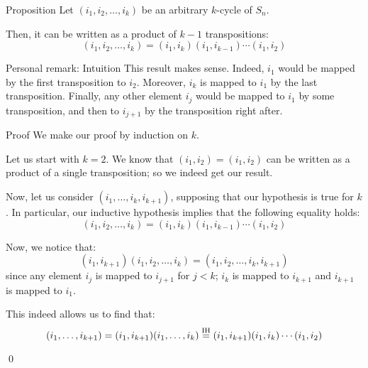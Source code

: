 \documentclass[a4paper]{article}
\begin{document}
\begin{parag}{Proposition}
    Let $\left(i_1, i_2, \ldots, i_k\right)$ be an arbitrary $k$-cycle of $S_n$.

    Then, it can be written as a product of $k-1$ transpositions: 
    \[\left(i_1, i_2, \ldots, i_k\right) = \left(i_1, i_k\right)\left(i_1, i_{k-1}\right)\cdots\left(i_1, i_{2}\right)\]

    \begin{subparag}{Personal remark: Intuition}
        This result makes sense. Indeed, $i_1$ would be mapped by the first transposition to $i_2$. Moreover, $i_k$ is mapped to $i_1$ by the last transposition. Finally, any other element $i_j$ would be mapped to $i_1$ by some transposition, and then to $i_{j+1}$ by the transposition right after.
    \end{subparag}

    \begin{subparag}{Proof}
        We make our proof by induction on $k$.

        Let us start with $k = 2$. We know that $\left(i_1, i_2\right) = \left(i_1, i_2\right)$ can be written as a product of a single transposition; so we indeed get our result.

        Now, let us consider $\left(i_1, \ldots, i_k, i_{k+1}\right)$, supposing that our hypothesis is true for $k$. In particular, our inductive hypothesis implies that the following equality holds:
        \[\left(i_1, i_2, \ldots, i_k\right) = \left(i_1, i_k\right)\left(i_1, i_{k-1}\right) \cdots \left(i_1, i_{2}\right)\]
        
        Now, we notice that: 
        \[\left(i_{1}, i_{k+1}\right)\left(i_1, i_2, \ldots, i_k\right) = \left(i_1, i_2, \ldots, i_k, i_{k+1}\right)\]
        since any element $i_j$ is mapped to $i_{j+1}$ for $j < k$; $i_k$ is mapped to $i_{k+1}$ and $i_{k+1}$ is mapped to $i_1$.
        
        This indeed allows us to find that: 
        \[\left(i_1, \ldots, i_{k+1}\right) = \left(i_1, i_{k+1}\right)\left(i_1, \ldots, i_k\right) \over{=}{IH} \left(i_1, i_{k+1}\right)\left(i_1, i_k\right)\cdots\left(i_1, i_2\right)\]
        
        \qed
    \end{subparag}
\end{parag}
\end{document}
